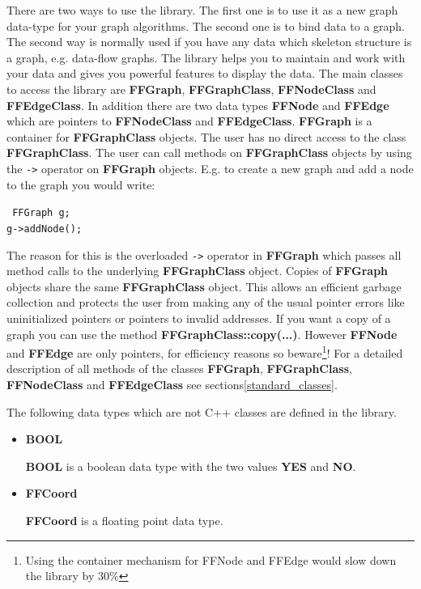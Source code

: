 
There are two ways to use the library. The first one is to use it as
a new graph data-type for your graph algorithms. The second one is to
bind data to a graph. The second way is normally used if you have
any data which skeleton structure is a graph, e.g. data-flow
graphs. The library helps you to maintain and work with your data
and gives you powerful features to display the data.  The main
classes to access the library are {\bf FFGraph}, {\bf
  FFGraphClass}, {\bf FFNodeClass} and {\bf FFEdgeClass}. In
addition there are two data types {\bf FFNode} and {\bf FFEdge}
which are pointers to {\bf FFNodeClass} and {\bf FFEdgeClass}.
{\bf FFGraph} is a container for {\bf FFGraphClass} objects. The
user has no direct access to the class {\bf FFGraphClass}. The
user can call methods on {\bf FFGraphClass} objects by using the
\verb|->| operator on {\bf FFGraph} objects. E.g. to create a new
graph and add a node to the graph you would write:

\bigskip

{\tt  
FFGraph g; \\
g\verb|->|addNode(); \\    
}

\bigskip

The reason for this is the overloaded \verb|->| operator in {\bf
  FFGraph} which passes all method calls to the underlying {\bf
  FFGraphClass} object. Copies of {\bf FFGraph} objects share the
same {\bf FFGraphClass} object. This allows an efficient garbage
collection and protects the user from making any of the usual pointer
errors like uninitialized pointers or pointers to invalid addresses. If
you want a copy of a graph you can use the method {\bf
FFGraphClass::copy(...)}. However {\bf FFNode} and {\bf FFEdge} are
only pointers, for efficiency reasons so beware\footnote{Using
  the container mechanism for FFNode and FFEdge would slow down
  the library by 30\%}!  For a detailed description of all
methods of the classes {\bf FFGraph}, {\bf FFGraphClass}, {\bf
  FFNodeClass} and {\bf FFEdgeClass} see
sections\vref{standard_classes}.

The following data types which are not C++ classes are defined in
the library. 

\begin{itemize}

\item{\bf BOOL}
  
  {\bf BOOL} is a boolean data type with the two values {\bf YES}
  and {\bf NO}. 

\item{\bf FFCoord}

  {\bf FFCoord} is a floating point data type.
  
\end{itemize}

